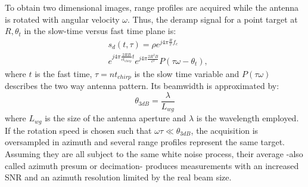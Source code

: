 To obtain two dimensional images, range profiles are acquired while the antenna is rotated with angular velocity $\omega$. 
Thus, the deramp signal for a point target at $R,\theta_t$ in the slow-time versus fast time plane is:
\begin{equation}\label{eq:signal_model}
	\begin{aligned}
	& s_{d}\left(t,\tau\right) = \rho e^{j 4 \pi \frac{ R}{c}f_c}   \\
	& e^{j 4 \pi \frac{2 R B }{c t_{chirp}} t}  e^{j 4 \pi \frac{2 R^2 B}{c^2}} P\left(\tau \omega - \theta_t\right),
	\end{aligned}
\end{equation} 
where $t$ is the fast time, $\tau = n t_{chirp}$ is the slow time variable and $P\left(\tau \omega\right)$ describes the two way antenna pattern. Its beamwidth is approximated by:
\begin{equation}\label{eq:azimuth_resolution}
	\theta_{3dB} = \frac{\lambda}{L_{wg}}
\end{equation}
where $L_{wg}$ is the size of the antenna aperture and $\lambda$ is the wavelength employed.
If the rotation speed is chosen such that $\omega \tau \ll \theta_{3dB}$, the acquisition is oversampled in azimuth and several range profiles represent the same target. Assuming they are all subject to the same white noise process, their average -also called azimuth presum or decimation- produces measurements with an increased SNR and an azimuth resolution limited by the real beam size.\\ 


